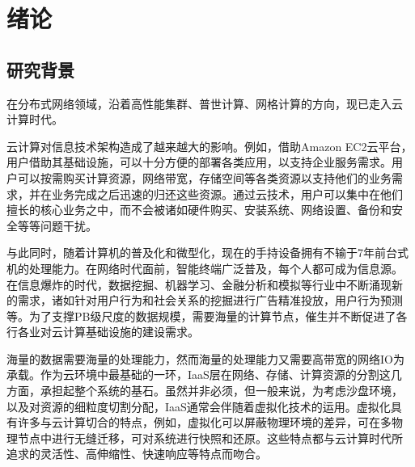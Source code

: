 \documentclass[phd]{jnuthesis}
\begin{document}
\tableofcontents

\listoffigures

\listoftables

\mainmatter

\chapter{绪论}\label{chapter_introduction}
\section{研究背景}

在分布式网络领域，沿着高性能集群、普世计算、网格计算的方向，现已走入云
计算时代。

云计算对信息技术架构造成了越来越大的影响。例如，借助Amazon EC2云平台，
用户借助其基础设施，可以十分方便的部署各类应用，以支持企业服务需求。用
户可以按需购买计算资源，网络带宽，存储空间等各类资源以支持他们的业务需
求，并在业务完成之后迅速的归还这些资源。通过云技术，用户可以集中在他们
擅长的核心业务之中，而不会被诸如硬件购买、安装系统、网络设置、备份和安
全等等问题干扰。

与此同时，随着计算机的普及化和微型化，现在的手持设备拥有不输于7年前台式
机的处理能力。在网络时代面前，智能终端广泛普及，每个人都可成为信息源。
在信息爆炸的时代，数据挖掘、机器学习、金融分析和模拟等行业中不断涌现新
的需求，诸如针对用户行为和社会关系的挖掘进行广告精准投放，用户行为预测
等。为了支撑PB级尺度的数据规模，需要海量的计算节点，催生并不断促进了各
行各业对云计算基础设施的建设需求。

海量的数据需要海量的处理能力，然而海量的处理能力又需要高带宽的网络IO为
承载。作为云环境中最基础的一环，IaaS层在网络、存储、计算资源的分割这几
方面，承担起整个系统的基石。虽然并非必须，但一般来说，为考虑沙盘环境，
以及对资源的细粒度切割分配，IaaS通常会伴随着虚拟化技术的运用。虚拟化具
有许多与云计算切合的特点，例如，虚拟化可以屏蔽物理环境的差异，可在多物
理节点中进行无缝迁移，可对系统进行快照和还原。这些特点都与云计算时代所
追求的灵活性、高伸缩性、快速响应等特点而吻合。
\end{document}
